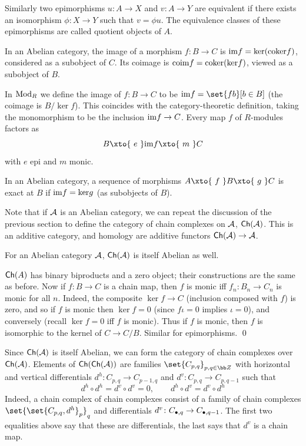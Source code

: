     Similarly two epimorphisms $u\colon A\to X$ and $v\colon A\to Y$ are equivalent if there exists an isomorphism $\phi\colon X\to Y$ such that $v=\phi u$.
    The equivalence classes of these epimorphisms are called {\emphcolor quotient objects} of $A$.

\edefn

\bdefn

    In an Abelian category, the {\emphcolor image} of a morphism $f\colon B\to C$ is ${\rm im} f={\rm ker}({\rm coker} f)$, considered as a subobject of $C$.
    Its {\emphcolor coimage} is ${\rm coim} f={\rm coker}({\rm ker} f)$, viewed as a subobject of $B$.

\edefn

In ${\rm Mod}_R$ we define the image of $f\colon B\to C$ to be $\im f=\set{fb}[b\in B]$ (the coimage is $B/\ker f$).
This coincides with the category-theoretic definition, taking the monomorphism to be the inclusion ${\rm im} f\to C$.
Every map $f$ of $R$-modules factors as
$$ B\xto{\ e\ }\im f\xto{\ m\ }C $$
with $e$ epi and $m$ monic.

\bdefn

    In an Abelian category, a sequence of morphisms $A\xto{\ f\ }B\xto{\ g\ }C$ is {\emphcolor exact} at $B$ if ${\rm im} f={\rm ker} g$ (as subobjects of $B$).

\edefn

Note that if ${{\cal A}}$ is an Abelian category, we can repeat the discussion of the previous section to define the category of chain complexes on ${{\cal A}}$, ${\sf Ch}({{\cal A}})$.
This is an additive category, and homology are additive functors ${\sf Ch}({{\cal A}})\to{{\cal A}}$.

\bthrm

    For an Abelian category ${{\cal A}}$, ${\sf Ch}({{\cal A}})$ is itself Abelian as well.

\ethrm

\bproof

    ${\sf Ch}(A)$ has binary biproducts and a zero object; their constructions are the same as before.
    Now if $f\colon B\to C$ is a chain map, then $f$ is monic iff $f_n\colon B_n\to C_n$ is monic for all $n$.
    Indeed, the composite $\ker f\to C$ (inclusion composed with $f$) is zero, and so if $f$ is monic then $\ker f=0$ (since $f\iota=0$ implies $\iota=0$), and conversely (recall $\ker f=0$ iff $f$ is monic).
    Thus if $f$ is monic, then $f$ is isomorphic to the kernel of $C\to C/B$.
    Similar for epimorphisms.
    \qed

\eproof

Since ${\sf Ch}({{\cal A}})$ is itself Abelian, we can form the category of chain complexes over ${\sf Ch}({{\cal A}})$.
Elements of ${\sf Ch}({\sf Ch}({{\cal A}}))$ are families $\set{C_{p,q}}_{p,q\in\bZ}$ with horizontal and vertical differentials $d^h\colon C_{p,q}\to C_{p-1,q}$ and $d^v\colon C_{p,q}\to C_{p,q-1}$ such that
$$ d^h\circ d^h = d^v\circ d^v = 0,\qquad d^h\circ d^v = d^v\circ d^h $$
Indeed, a chain complex of chain complexes consist of a family of chain complexes $\set{\set{C_{p,q},d^h}_p}_q$ and differentials $d^v\colon C_{\bullet,q}\to C_{\bullet,q-1}$.
The first two equalities above say that these are differentials, the last says that $d^v$ is a chain map.

